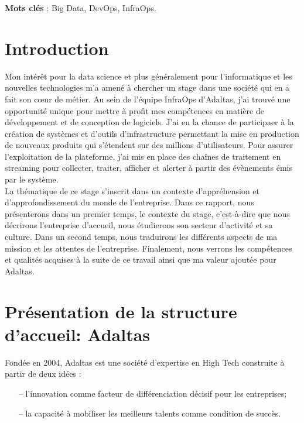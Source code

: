 \documentclass[12pt, french]{report}
\begin{document}
\noindent\textbf{Mots clés} : Big Data, DevOps, InfraOps.

\newpage
\thispagestyle{empty}
\mbox{}
\newpage

\begingroup
\hypersetup{linkcolor=black}
\listoffigures
\tableofcontents
\newpage
\endgroup

\chapter*{Introduction}

Mon intérêt pour la data science et plus généralement pour l’informatique et les nouvelles technologies m’a amené à chercher un stage dans une société qui en a fait son cœur de métier. Au sein de l'équipe InfraOps d'Adaltas, j'ai trouvé une opportunité unique pour mettre à profit mes compétences en matière de développement et de conception de logiciels. J'ai eu la chance de participaer à la création de systèmes et d'outils d'infrastructure permettant la mise en production de nouveaux produits qui s'étendent sur des millions d'utilisateurs. Pour assurer l’exploitation de la plateforme, j'ai mis en place des chaînes de traitement en streaming pour collecter, traiter, afficher et alerter à partir des évènements émis par le système.\\

La thématique de ce stage s’inscrit dans un contexte d’appréhension et d'approfondissement du monde de l’entreprise. Dans ce rapport, nous présenterons dans un premier temps, le contexte du stage, c’est-à-dire que nous décrirons l’entreprise d’accueil, nous étudierons son secteur d’activité et sa culture. Dans un second temps, nous traduirons les différents aspects de ma mission et les attentes de l'entreprise. Finalement, nous verrons les compétences et qualités acquises à la suite de ce travail ainsi que ma valeur ajoutée pour Adaltas.

\chapter{Présentation de la structure d'accueil: Adaltas}

Fondée en 2004, Adaltas est une société d’expertise en High Tech construite à partir de deux idées :
\begin{itemize}
  \item[--] l’innovation comme facteur de différenciation décisif pour les entreprises;
  \item[--] la capacité à mobiliser les meilleurs talents comme condition de succès.\\
\end{itemize}
\end{document}
